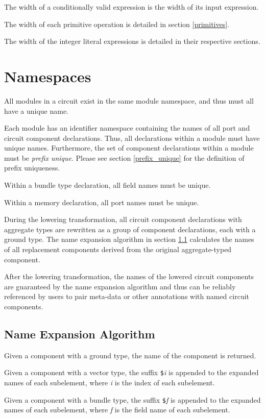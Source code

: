 \documentclass[12pt]{article}
\begin{document}
The width of a conditionally valid expression is the width of its input expression.

The width of each primitive operation is detailed in section \ref{primitives}.

The width of the integer literal expressions is detailed in their respective sections.

\section{Namespaces}

All modules in a circuit exist in the same module namespace, and thus must all have a unique name.

Each module has an identifier namespace containing the names of all port and circuit component declarations. Thus, all declarations within a module must have unique names. Furthermore, the set of component declarations within a module must be {\em prefix unique}. Please see section \ref{prefix_unique} for the definition of prefix uniqueness.

Within a bundle type declaration, all field names must be unique.

Within a memory declaration, all port names must be unique.

During the lowering transformation, all circuit component declarations with aggregate types are rewritten as a group of component declarations, each with a ground type. The name expansion algorithm in section \ref{expansion_algorithm} calculates the names of all replacement components derived from the original aggregate-typed component.

After the lowering transformation, the names of the lowered circuit components are guaranteed by the name expansion algorithm and thus can be reliably referenced by users to pair meta-data or other annotations with named circuit components.

\subsection{Name Expansion Algorithm} \label{expansion_algorithm}

Given a component with a ground type, the name of the component is returned.

Given a component with a vector type, the suffix \verb|$|{\em i} is appended to the expanded names of each subelement, where {\em i} is the index of each subelement.

Given a component with a bundle type, the suffix \verb|$|{\em f} is appended to the expanded names of each subelement, where {\em f} is the field name of each subelement.
\end{document}
